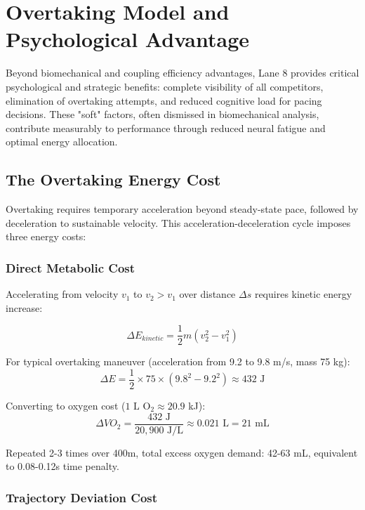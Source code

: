 \section{Overtaking Model and Psychological Advantage}

Beyond biomechanical and coupling efficiency advantages, Lane 8 provides critical psychological and strategic benefits: complete visibility of all competitors, elimination of overtaking attempts, and reduced cognitive load for pacing decisions. These "soft" factors, often dismissed in biomechanical analysis, contribute measurably to performance through reduced neural fatigue and optimal energy allocation.

\subsection{The Overtaking Energy Cost}

Overtaking requires temporary acceleration beyond steady-state pace, followed by deceleration to sustainable velocity. This acceleration-deceleration cycle imposes three energy costs:

\subsubsection{Direct Metabolic Cost}

Accelerating from velocity $v_1$ to $v_2 > v_1$ over distance $\Delta s$ requires kinetic energy increase:

\begin{equation}
\Delta E_{kinetic} = \frac{1}{2}m(v_2^2 - v_1^2)
\end{equation}

For typical overtaking maneuver (acceleration from 9.2 to 9.8 m/s, mass 75 kg):
\begin{equation}
\Delta E = \frac{1}{2} \times 75 \times (9.8^2 - 9.2^2) \approx 432 \text{ J}
\end{equation}

Converting to oxygen cost ($1 \text{ L O}_2 \approx 20.9$ kJ):
\begin{equation}
\Delta VO_2 = \frac{432 \text{ J}}{20,900 \text{ J/L}} \approx 0.021 \text{ L} = 21 \text{ mL}
\end{equation}

Repeated 2-3 times over 400m, total excess oxygen demand: 42-63 mL, equivalent to 0.08-0.12s time penalty.

\subsubsection{Trajectory Deviation Cost}

